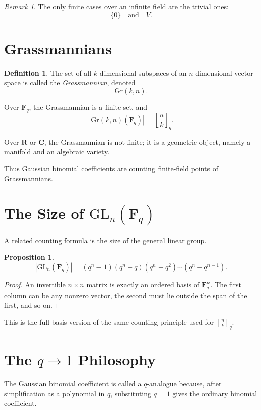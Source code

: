 \documentclass[11pt]{article}
\newtheorem{proposition}[theorem]{Proposition}
\theoremstyle{definition}
\newtheorem{definition}[theorem]{Definition}
\theoremstyle{remark}
\newtheorem{remark}[theorem]{Remark}
\newcommand{\F}{\mathbf{F}}
\newcommand{\R}{\mathbf{R}}
\newcommand{\C}{\mathbf{C}}
\newcommand{\GL}{\mathrm{GL}}
\newcommand{\Gr}{\mathrm{Gr}}
\newcommand{\qbinom}[2]{\genfrac{[}{]}{0pt}{}{#1}{#2}_q}
\begin{document}
	\begin{remark}
		The only finite cases over an infinite field are the trivial ones:
		\[
		\{0\}
		\quad\text{and}\quad
		V.
		\]
	\end{remark}
	
	\section{Grassmannians}
	
	\begin{definition}
		The set of all \(k\)-dimensional subspaces of an \(n\)-dimensional vector space is called the \emph{Grassmannian}, denoted
		\[
		\Gr(k,n).
		\]
	\end{definition}
	
	Over \(\F_q\), the Grassmannian is a finite set, and
	\[
	|\Gr(k,n)(\F_q)|=\qbinom{n}{k}.
	\]
	
	Over \(\R\) or \(\C\), the Grassmannian is not finite; it is a geometric object, namely a manifold and an algebraic variety.
	
	Thus Gaussian binomial coefficients are counting finite-field points of Grassmannians.
	
	\section{The Size of \(\GL_n(\F_q)\)}
	
	A related counting formula is the size of the general linear group.
	
	\begin{proposition}
		\[
		|\GL_n(\F_q)|=(q^n-1)(q^n-q)(q^n-q^2)\cdots(q^n-q^{n-1}).
		\]
	\end{proposition}
	
	\begin{proof}
		An invertible \(n\times n\) matrix is exactly an ordered basis of \(\F_q^n\). The first column can be any nonzero vector, the second must lie outside the span of the first, and so on.
	\end{proof}
	
	This is the full-basis version of the same counting principle used for \(\qbinom{n}{k}\).
	
	\section{The \(q\to 1\) Philosophy}
	
	The Gaussian binomial coefficient is called a \(q\)-analogue because, after simplification as a polynomial in \(q\), substituting \(q=1\) gives the ordinary binomial coefficient.
	
\end{document}
